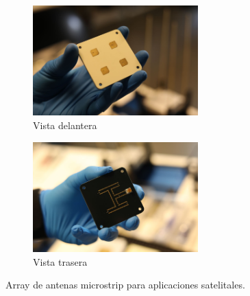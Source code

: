 \begin{figure}[h]
     \centering
     \begin{subfigure}[b]{\textwidth}
         \centering
         \includegraphics[width=0.7\textwidth]{archivos/enduro1}
         \caption{Vista delantera}
         \label{fig:endur1}
     \end{subfigure}
\vfill
     \begin{subfigure}[b]{\textwidth}
         \centering
         \includegraphics[width=0.7\textwidth]{archivos/enduro2}
         \caption{Vista trasera}
         \label{fig:endur2}
     \end{subfigure}

        \caption{Array de antenas microstrip para aplicaciones satelitales. \citep{Endurosat2018}}
        \label{fig:endur}
\end{figure}
\vfill
